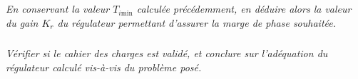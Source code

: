 \documentclass[10pt,fleqn]{article} %
\begin{document}
\begin{multicols}{2}
\subparagraph{}\textit{En conservant la valeur $T_{i\text{min}}$ calculée précédemment, en déduire alors la
valeur du gain $K_r$ du régulateur permettant d’assurer la marge de phase souhaitée.}

\subparagraph{}\textit{Vérifier si le cahier des charges est validé, et conclure sur l’adéquation
du régulateur calculé vis-à-vis du problème posé.}
%
%

\end{multicols}

%
\end{document}
